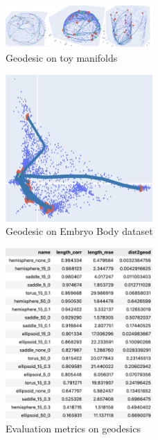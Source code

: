 \documentclass{article}
\theoremstyle{plain}
\theoremstyle{definition}
\theoremstyle{remark}
\begin{document}
\begin{figure}[htbp]
    \centering
    \includegraphics[width=0.5\textwidth]{fig/geod_toy.png}
    \caption{Geodesic on toy manifolds}
    \label{fig:geod_toy}
\end{figure}

\begin{figure}[htbp]
    \centering
    \includegraphics[width=0.5\textwidth]{fig/geod_eb.png}
    \caption{Geodesic on Embryo Body dataset}
    \label{fig:geod_eb}
\end{figure}

\begin{figure}[htbp]
    \centering
    \includegraphics[width=0.5\textwidth]{fig/geod_metrics.png}
    \caption{Evaluation metrics on geodesics}
    \label{fig:geod_metrics}
\end{figure}
\end{document}
